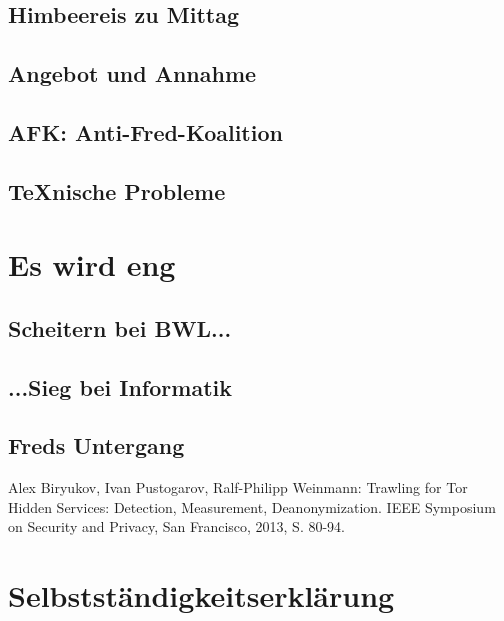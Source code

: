 \documentclass[12pt]{scrartcl}
\begin{document}
	\subsection{Himbeereis zu Mittag}
	\subsection{Angebot und Annahme}
	\subsection{AFK: Anti-Fred-Koalition}
	\subsection{TeXnische Probleme}
	
	\newpage
	\section{Es wird eng}
	\subsection{Scheitern bei BWL...}
	\subsection{...Sieg bei Informatik}
	\subsection{Freds Untergang}

	\newpage
	\begin{raggedright}%
		\begin{thebibliography}{XXXXXXXX}
		 Alex Biryukov, Ivan Pustogarov, Ralf-Philipp Weinmann: Trawling for Tor Hidden Services: Detection, Measurement, Deanonymization. IEEE Symposium on Security and Privacy, San Francisco, 2013, S. 80-94.
		\end{thebibliography}
	\end{raggedright}
	
	\newpage
	
	\section{Selbstständigkeitserklärung}
	
\end{document}
